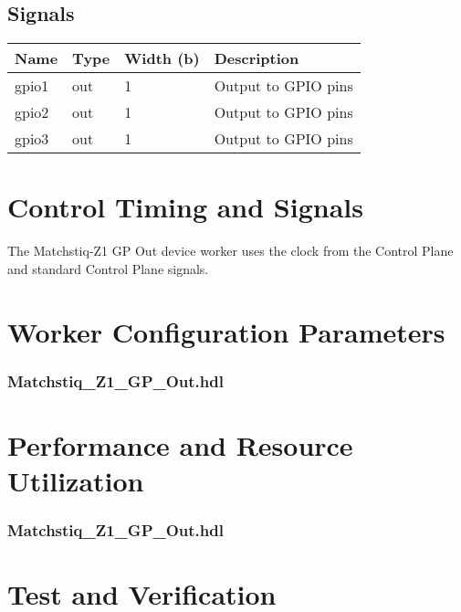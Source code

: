 \documentclass{article}
\def\comp{Matchstiq\_Z1\_GP\_Out}
\edef\ecomp{matchstiq_z1_gp_out}
\begin{document}
\begin{landscape}
\section*{Signals}
	\begin{scriptsize}
		\begin{tabular}{|M{2.5cm}|M{3cm}|M{6.5cm}|M{9.2cm}|}
			\hline
			Name         & Type   & Width (b) & Description                       \\
			\hline
			gpio1    & out & 1 & Output to GPIO pins            \\
			\hline
			gpio2    & out & 1 & Output to GPIO pins            \\
			\hline
			gpio3    & out & 1 & Output to GPIO pins            \\
			\hline
		\end{tabular}
	\end{scriptsize}
\end{landscape}

\section*{Control Timing and Signals}
\begin{flushleft}
The Matchstiq-Z1 GP Out device worker uses the clock from the Control Plane and standard Control Plane signals.
\end{flushleft}

\begin{landscape}
\section*{Worker Configuration Parameters}
\subsubsection*{\comp.hdl}
%
\section*{Performance and Resource Utilization}
\subsubsection*{\comp.hdl}
%
\end{landscape}



\section*{Test and Verification}
\normalsize
\end{document}
